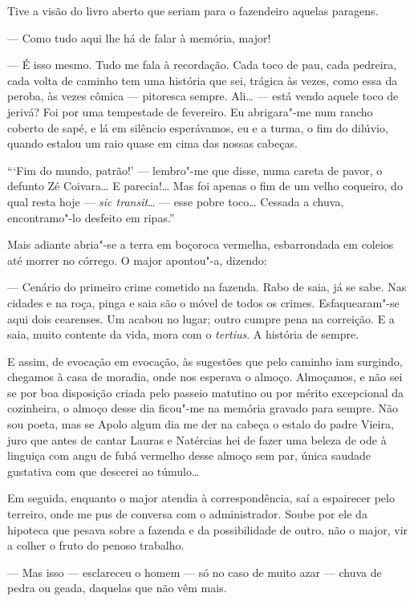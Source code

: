 Tive a visão do livro aberto que seriam para o fazendeiro aquelas
paragens.

--- Como tudo aqui lhe há de falar à memória, major!

--- É isso mesmo. Tudo me fala à recordação. Cada toco de pau, cada
pedreira, cada volta de caminho tem uma história que sei, trágica às
vezes, como essa da peroba, às vezes cômica --- pitoresca sempre.
Ali\ldots{} --- está vendo aquele toco de jerivá? Foi por uma tempestade
de fevereiro. Eu abrigara"-me num rancho coberto de sapé, e lá em
silêncio esperávamos, eu e a turma, o fim do dilúvio, quando estalou um
raio quase em cima das nossas cabeças.

```Fim do mundo, patrão!' --- lembro"-me que disse, numa careta de pavor,
o defunto Zé Coivara\ldots{} E parecia!\ldots{} Mas foi apenas o fim de um velho
coqueiro, do qual resta hoje --- \emph{sic transit}\ldots{} --- esse pobre
toco\ldots{} Cessada a chuva, encontramo"-lo desfeito em ripas.''

Mais adiante abria"-se a terra em boçoroca vermelha, esbarrondada em
coleios até morrer no córrego. O major apontou"-a, dizendo:

--- Cenário do primeiro crime cometido na fazenda. Rabo de saia, já se
sabe. Nas cidades e na roça, pinga e saia são o móvel de todos os
crimes. Esfaquearam"-se aqui dois cearenses. Um acabou no lugar; outro
cumpre pena na correição. E a saia, muito contente da vida, mora com o
\emph{tertius}. A história de sempre.

E assim, de evocação em evocação, às sugestões que pelo caminho iam
surgindo, chegamos à casa de moradia, onde nos esperava o almoço.
Almoçamos, e não sei se por boa disposição criada pelo passeio matutino
ou por mérito excepcional da cozinheira, o almoço desse dia ficou"-me na
memória gravado para sempre. Não sou poeta, mas se Apolo algum dia me
der na cabeça o estalo do padre Vieira, juro que antes de cantar Lauras
e Natércias hei de fazer uma beleza de ode à linguiça com angu de fubá
vermelho desse almoço sem par, única saudade gustativa com que descerei
ao túmulo\ldots{}

Em seguida, enquanto o major atendia à correspondência, saí a espairecer
pelo terreiro, onde me pus de conversa com o administrador. Soube por
ele da hipoteca que pesava sobre a fazenda e da possibilidade de outro,
não o major, vir a colher o fruto do penoso trabalho.

--- Mas isso --- esclareceu o homem --- só no caso de muito azar ---
chuva de pedra ou geada, daquelas que não vêm mais.

